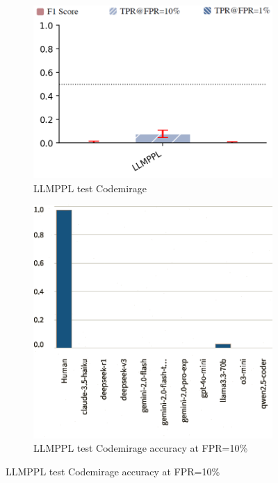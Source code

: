\begin{figure}[H]
    \begin{subfigure}[b]{0.4\textwidth}
        \centering
        \includegraphics[width=\linewidth]{img/TEST/LLMPPL/UncoveringTest.png}
        \caption{LLMPPL test Codemirage}
        \label{fig:6}
    \end{subfigure}
    \hfill
    \begin{subfigure}[t]{0.4\textwidth}
        \centering
        \includegraphics[width=\linewidth]{img/TEST/LLMPPL/visualization(34).png}
        \caption{LLMPPL test Codemirage accuracy at FPR=10\%}
        \label{fig:b6}
    \end{subfigure}
\end{figure}

